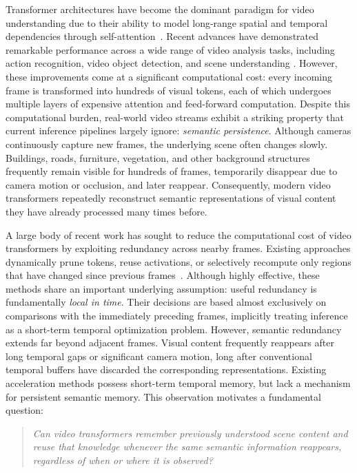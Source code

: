 \documentclass[letterpaper]{article}
\begin{document}
Transformer architectures have become the dominant paradigm for video understanding due to their ability to model long-range spatial and temporal dependencies through self-attention~\cite{vit,vivit,videomae}. Recent advances have demonstrated remarkable performance across a wide range of video analysis tasks, including action recognition, video object detection, and scene understanding \cite{vivit,vitdet}. However, these improvements come at a significant computational cost: every incoming frame is transformed into hundreds of visual tokens, each of which undergoes multiple layers of expensive attention and feed-forward computation.
%
Despite this computational burden, real-world video streams exhibit a striking property that current inference pipelines largely ignore: \emph{semantic persistence}. Although cameras continuously capture new frames, the underlying scene often changes slowly. Buildings, roads, furniture, vegetation, and other background structures frequently remain visible for hundreds of frames, temporarily disappear due to camera motion or occlusion, and later reappear. Consequently, modern video transformers repeatedly reconstruct semantic representations of visual content they have already processed many times before.
 
 
A large body of recent work has sought to reduce the computational cost of video transformers by exploiting redundancy across nearby frames. Existing approaches dynamically prune tokens, reuse activations, or selectively recompute only regions that have changed since previous frames~\cite{eventful,stgt,deltacnn,maskvd,cstvit}. Although highly effective, these methods share an important underlying assumption: useful redundancy is fundamentally \emph{local in time}. Their decisions are based almost exclusively on comparisons with the immediately preceding frames, implicitly treating inference as a short-term temporal optimization problem.
%
However, semantic redundancy extends far beyond adjacent frames. Visual content frequently reappears after long temporal gaps or significant camera motion, long after conventional temporal buffers have discarded the corresponding representations. Existing acceleration methods possess short-term temporal memory, but lack a mechanism for persistent semantic memory.
%
This observation motivates a fundamental question:
 
\begin{quote}
\emph{Can video transformers remember previously understood scene content and reuse that knowledge whenever the same semantic information reappears, regardless of when or where it is observed?}
\end{quote}
 
\end{document}
